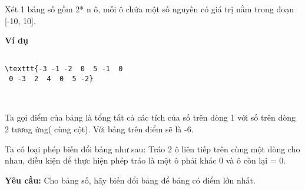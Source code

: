 Xét 1 bảng số gồm 2* n ô, mỗi ô chứa một số nguyên có giá trị nằm trong đoạn [-10, 10].

\textbf{Ví dụ }
\begin{verbatim}

\texttt{-3 -1 -2  0  5 -1  0
 0 -3  2  4  0  5 -2}\end{verbatim}

 

Ta gọi điểm của bảng là tổng tất cả các tích của số trên dòng 1 với số trên dòng 2 tương ứng( cùng cột). Với bảng trên điểm sẽ là -6.

Ta có loại phép biến đổi bảng như sau: Tráo 2 ô liên tiếp trên cùng một dòng cho nhau, điều kiện để thực hiện phép tráo là một ô phải khác 0 và ô còn lại = 0.

\textbf{Yêu cầu: } Cho bảng số, hãy biến đổi bảng để bảng có điểm lớn nhất.